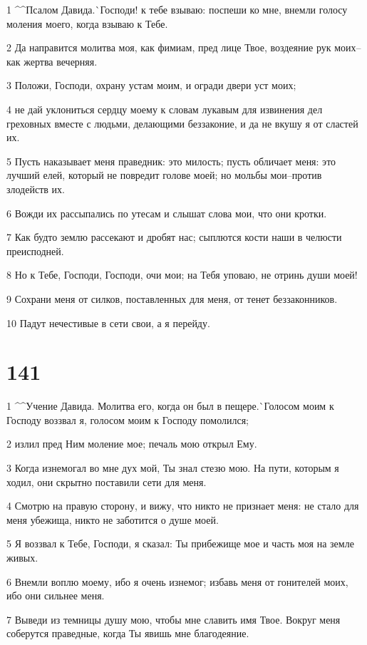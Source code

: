 \par 1 ^^Псалом Давида.^^ Господи! к тебе взываю: поспеши ко мне, внемли голосу моления моего, когда взываю к Тебе.
\par 2 Да направится молитва моя, как фимиам, пред лице Твое, воздеяние рук моих--как жертва вечерняя.
\par 3 Положи, Господи, охрану устам моим, и огради двери уст моих;
\par 4 не дай уклониться сердцу моему к словам лукавым для извинения дел греховных вместе с людьми, делающими беззаконие, и да не вкушу я от сластей их.
\par 5 Пусть наказывает меня праведник: это милость; пусть обличает меня: это лучший елей, который не повредит голове моей; но мольбы мои--против злодейств их.
\par 6 Вожди их рассыпались по утесам и слышат слова мои, что они кротки.
\par 7 Как будто землю рассекают и дробят нас; сыплются кости наши в челюсти преисподней.
\par 8 Но к Тебе, Господи, Господи, очи мои; на Тебя уповаю, не отринь души моей!
\par 9 Сохрани меня от силков, поставленных для меня, от тенет беззаконников.
\par 10 Падут нечестивые в сети свои, а я перейду.

\chapter{141}

\par 1 ^^Учение Давида. Молитва его, когда он был в пещере.^^ Голосом моим к Господу воззвал я, голосом моим к Господу помолился;
\par 2 излил пред Ним моление мое; печаль мою открыл Ему.
\par 3 Когда изнемогал во мне дух мой, Ты знал стезю мою. На пути, которым я ходил, они скрытно поставили сети для меня.
\par 4 Смотрю на правую сторону, и вижу, что никто не признает меня: не стало для меня убежища, никто не заботится о душе моей.
\par 5 Я воззвал к Тебе, Господи, я сказал: Ты прибежище мое и часть моя на земле живых.
\par 6 Внемли воплю моему, ибо я очень изнемог; избавь меня от гонителей моих, ибо они сильнее меня.
\par 7 Выведи из темницы душу мою, чтобы мне славить имя Твое. Вокруг меня соберутся праведные, когда Ты явишь мне благодеяние.

